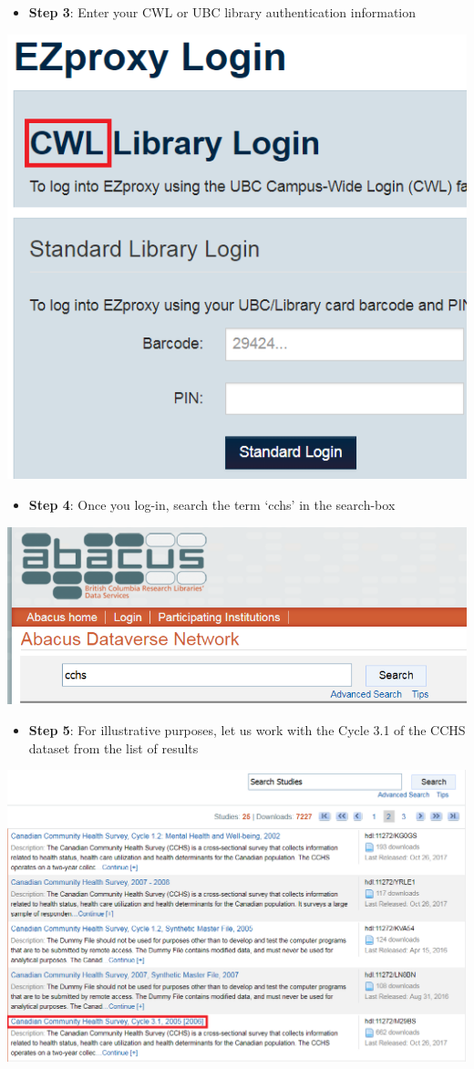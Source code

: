 \documentclass[
]{book}
\providecommand{\tightlist}{%
  \setlength{\itemsep}{0pt}\setlength{\parskip}{0pt}}
\begin{document}
\begin{itemize}
\tightlist
\item
  \textbf{Step 3}: Enter your CWL or UBC library authentication information
\end{itemize}

\includegraphics[width=0.65\linewidth]{images/abacus3}

\begin{itemize}
\tightlist
\item
  \textbf{Step 4}: Once you log-in, search the term `cchs' in the search-box
\end{itemize}

\includegraphics[width=0.65\linewidth]{images/abacus4}

\begin{itemize}
\tightlist
\item
  \textbf{Step 5}: For illustrative purposes, let us work with the Cycle 3.1 of the CCHS dataset from the list of results
\end{itemize}

\includegraphics[width=0.65\linewidth]{images/abacus5}
\end{document}
